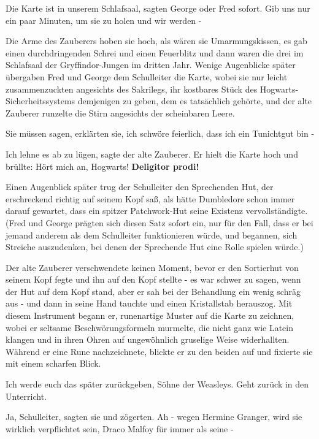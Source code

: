 \glqq{}Die Karte ist in unserem Schlafsaal\grqq{}, sagten George oder Fred
sofort. \glqq{}Gib uns nur ein paar Minuten, um sie zu holen und wir werden
-\grqq{}

Die Arme des Zauberers hoben sie hoch, als wären sie Umarmungskissen, es gab
einen durchdringenden Schrei und einen Feuerblitz und dann waren die drei im
Schlafsaal der Gryffindor-Jungen im dritten Jahr. Wenige Augenblicke später
übergaben Fred und George dem Schulleiter die Karte, wobei sie nur leicht
zusammenzuckten angesichts des Sakrilegs, ihr kostbares Stück des
Hogwarts-Sicherheitssystems demjenigen zu geben, dem es tatsächlich gehörte, und
der alte Zauberer runzelte die Stirn angesichts der scheinbaren Leere.

\glqq{}Sie müssen sagen\grqq{}, erklärten sie, \glqq{}ich schwöre feierlich, dass
ich ein Tunichtgut bin -\grqq{}

\glqq{}Ich lehne es ab zu lügen\grqq{}, sagte der alte Zauberer. Er hielt die
Karte hoch und brüllte: \glqq{}Hört mich an, Hogwarts! \textbf{Deligitor
prodi!}\grqq{}

Einen Augenblick später trug der Schulleiter den Sprechenden Hut, der
erschreckend richtig auf seinem Kopf saß, als hätte Dumbledore schon immer
darauf gewartet, dass ein spitzer Patchwork-Hut seine Existenz vervollständigte.
(Fred und George prägten sich diesen Satz sofort ein, nur für den Fall, dass er
bei jemand anderem als dem Schulleiter funktionieren würde, und begannen, sich
Streiche auszudenken, bei denen der Sprechende Hut eine Rolle spielen würde.)

Der alte Zauberer verschwendete keinen Moment, bevor er den Sortierhut von
seinem Kopf fegte und ihn auf den Kopf stellte - es war schwer zu sagen, wenn
der Hut auf dem Kopf stand, aber er sah bei der Behandlung ein wenig schräg aus
- und dann in seine Hand tauchte und einen Kristallstab herauszog. Mit diesem
Instrument begann er, runenartige Muster auf die Karte zu zeichnen, wobei er
seltsame Beschwörungsformeln murmelte, die nicht ganz wie Latein klangen und in
ihren Ohren auf ungewöhnlich gruselige Weise widerhallten. Während er eine Rune
nachzeichnete, blickte er zu den beiden auf und fixierte sie mit einem scharfen
Blick.

\glqq{}Ich werde euch das später zurückgeben, Söhne der Weasleys. Geht zurück in
den Unterricht.\grqq{}

\glqq{}Ja, Schulleiter\grqq{}, sagten sie und zögerten. \glqq{}Ah - wegen Hermine
Granger, wird sie wirklich verpflichtet sein, Draco Malfoy für immer als seine
-\grqq{}

